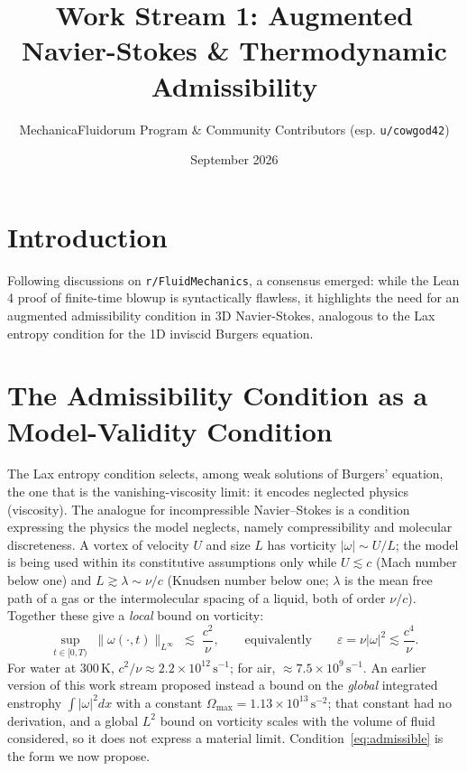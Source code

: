 \documentclass[11pt]{article}
\title{Work Stream 1: Augmented Navier-Stokes \& Thermodynamic Admissibility}
\author{MechanicaFluidorum Program \& Community Contributors (esp. \texttt{u/cowgod42})}
\date{September 2026}
\begin{document}
\maketitle

\section{Introduction}
Following discussions on \texttt{r/FluidMechanics}, a consensus emerged: while the Lean 4 proof of finite-time blowup is syntactically flawless, it highlights the need for an augmented admissibility condition in 3D Navier-Stokes, analogous to the Lax entropy condition for the 1D inviscid Burgers equation. 

\section{The Admissibility Condition as a Model-Validity Condition}
The Lax entropy condition selects, among weak solutions of Burgers' equation, the one that is the vanishing-viscosity limit: it encodes neglected physics (viscosity). The analogue for incompressible Navier--Stokes is a condition expressing the physics the model neglects, namely compressibility and molecular discreteness. A vortex of velocity $U$ and size $L$ has vorticity $|\omega|\sim U/L$; the model is being used within its constitutive assumptions only while $U\lesssim c$ (Mach number below one) and $L\gtrsim\lambda\sim\nu/c$ (Knudsen number below one; $\lambda$ is the mean free path of a gas or the intermolecular spacing of a liquid, both of order $\nu/c$). Together these give a \emph{local} bound on vorticity:
\begin{equation}
    \sup_{t\in[0,T)}\;\|\omega(\cdot,t)\|_{L^\infty} \;\lesssim\; \frac{c^2}{\nu},
    \qquad\text{equivalently}\qquad \varepsilon=\nu|\omega|^2\lesssim\frac{c^4}{\nu}.
    \label{eq:admissible}
\end{equation}
For water at 300\,K, $c^2/\nu\approx2.2\times10^{12}\,\mathrm{s^{-1}}$; for air, $\approx7.5\times10^{9}\,\mathrm{s^{-1}}$. An earlier version of this work stream proposed instead a bound on the \emph{global} integrated enstrophy $\int|\omega|^2dx$ with a constant $\Omega_{\max}=1.13\times10^{13}\,\mathrm{s^{-2}}$; that constant had no derivation, and a global $L^2$ bound on vorticity scales with the volume of fluid considered, so it does not express a material limit. Condition~\eqref{eq:admissible} is the form we now propose.
\end{document}

